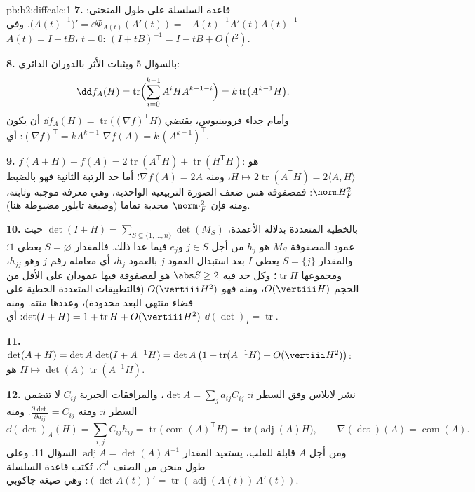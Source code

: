 \begin{solution}{pb:b2:diffcalc:1}
\textbf{7.} قاعدة السلسلة على طول المنحنى:
$\bigl(A(t)^{-1}\bigr)' = \dd\Phi_{A(t)}(A'(t)) =
-A(t)^{-1}A'(t)A(t)^{-1}$. وفي $A(t) = I + tB$، $t = 0$: $(I +
tB)^{-1} = I - tB + O(t^2)$.

\textbf{8.} بالسؤال 5 وبثبات الأثر بالدوران الدائري:
\[
\dd f_A(H) = \operatorname{tr}\Bigl(\sum_{i=0}^{k-1}
A^iHA^{k-1-i}\Bigr) = k\operatorname{tr}\bigl(A^{k-1}H\bigr) .
\]
وأمام جداء فروبينيوس، يقتضي $\dd f_A(H) =
\operatorname{tr}\bigl((\nabla f)^{\mathsf T}H\bigr)$ أن يكون
$(\nabla f)^{\mathsf T} = kA^{k-1}$: أي $\nabla f(A) =
k\,(A^{k-1})^{\mathsf T}$.

\textbf{9.} $f(A + H) - f(A) = 2\operatorname{tr}
(A^{\mathsf T}H) + \operatorname{tr}(H^{\mathsf T}H)$:  هو $H \mapsto 2\operatorname{tr}(A^{\mathsf T}H) =
2\langle A, H\rangle$، ومنه $\nabla f(A) = 2A$؛ أما حد الرتبة
الثانية فهو بالضبط $\norm H_F^2$: فمصفوفة هس ضعف الصورة التربيعية
الواحدية، وهي معرفة موجبة وثابتة، ومنه فإن
$\norm\cdot_F^2$ محدبة تماما (وصيغة تايلور مضبوطة هنا).

\textbf{10.} بالخطية المتعددة بدلالة الأعمدة، $\det(I + H) =
\sum_{S\subseteq\{1,\dots,n\}}\det(M_S)$ حيث عمود
المصفوفة $M_S$ هو $h_j$ من أجل $j \in S$ و$e_j$ فيما عدا ذلك. فالمقدار
$S = \varnothing$ يعطي $1$؛ والمقدار $S = \{j\}$ يعطي  $I$ بعد استبدال
العمود $j$ بالعمود $h_j$، أي معامله رقم $j$ وهو $h_{jj}$،
ومجموعها $\operatorname{tr}H$؛ وكل حد فيه $\abs S \geq 2$ هو  لمصفوفة فيها عمودان
على الأقل من الحجم $O(\vertiii H)$، ومنه فهو $O(\vertiii H^2)$ (فالتطبيقات المتعددة
الخطية على فضاء منتهي البعد محدودة)، وعددها منته. ومنه $\det(I + H) = 1 + \operatorname{tr}H +
O(\vertiii H^2)$: أي
$\dd(\det)_I = \operatorname{tr}$.

\textbf{11.} $\det(A + H) = \det A\,\det(I + A^{-1}H) =
\det A\,\bigl(1 + \operatorname{tr}(A^{-1}H) +
O(\vertiii H^2)\bigr)$:  هو $H \mapsto
\det(A)\operatorname{tr}(A^{-1}H)$.

\textbf{12.} نشر لابلاس وفق السطر $i$: $\det A =
\sum_j a_{ij}C_{ij}$، والمرافقات الجبرية
$C_{ij}$ لا تتضمن السطر $i$: ومنه $\frac{\partial\det}{\partial a_{ij}} = C_{ij}$. ومنه
\[
\dd(\det)_A(H) = \sum_{i,j}C_{ij}h_{ij}
= \operatorname{tr}\bigl(\operatorname{com}(A)^{\mathsf T}
H\bigr)
= \operatorname{tr}\bigl(\operatorname{adj}(A)H\bigr),
\qquad
\nabla(\det)(A) = \operatorname{com}(A) .
\]
ومن أجل $A$ قابلة للقلب، يستعيد المقدار $\operatorname{adj}A = \det(A)A^{-1}$
السؤال 11. وعلى طول منحن من الصنف $C^1$، تُكتب قاعدة السلسلة
$(\det A(t))' = \operatorname{tr}(\operatorname{adj}
(A(t))\,A'(t))$: وهي صيغة جاكوبي.


\end{solution}

